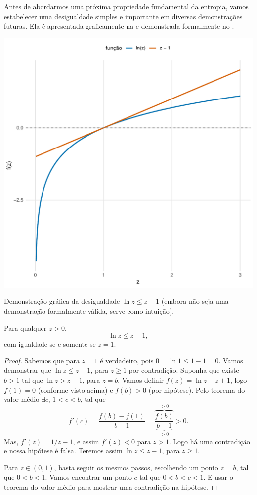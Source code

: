 Antes de abordarmos uma próxima propriedade fundamental da entropia, vamos
estabelecer uma desigualdade simples e importante em diversas demonstrações
futuras. Ela é apresentada graficamente na  e demonstrada
formalmente no .
\begin{marginfigure}%
    \includegraphics[width=\linewidth]{plots/lnzzm1.pdf}
    \caption{Demonstração gráfica da desigualdade $\ln z \leq z - 1$ (embora
    não seja uma demonstração formalmente válida, serve como intuição).}
    \label{fig:lnzzm1}
\end{marginfigure}
\begin{lemma}\label{lm:desfundamental}
Para qualquer $z > 0$,
\begin{equation}\label{eq:fund-ineq}
    \ln z \leq z - 1,
\end{equation}
com igualdade se e somente se $z = 1$.
\end{lemma}
\begin{proof}
Sabemos que para $z = 1$ é verdadeiro, pois $0 = \ln 1 \leq 1 - 1 = 0$.
Vamos demonstrar que $\ln z \leq z-1$, para $z \geq 1$ por contradição.
Suponha que existe $b > 1$ tal que $\ln z > z - 1$, para $z=b$.
Vamos definir $f(z) = \ln z - z + 1$, logo $f(1) = 0$ (conforme visto acima)
e $f(b) > 0$ (por hipótese).
Pelo teorema do valor médio $\exists c$, $1 < c < b$, tal que
\begin{equation}
f'(c) = \frac{f(b) - f(1)}{b - 1} = \frac{\overbrace{f(b)}^{>0}}{\underbrace{b-1}_{>0}} > 0 .
\end{equation}
Mas, $f'(z) = 1/z -1$, e assim $f'(z) < 0$ para $z>1$. Logo há uma contradição
e nossa hipótese é falsa. Teremos assim $\ln z \leq z-1$, para $z \geq 1$.

Para $z \in (0,1)$, basta seguir os mesmos passos, escolhendo um ponto
$z=b$, tal que $0 < b < 1$. Vamos encontrar um ponto $c$ tal que $0 < b < c < 1$.
E usar o teorema do valor médio para mostrar uma contradição na hipótese.
\end{proof}

